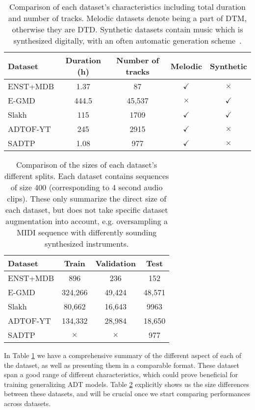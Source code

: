 \begin{table}[H]
    \centering
    \hspace*{-0.6cm}
    \begin{tabular}{l|cccc}
        Dataset & Duration (h) & Number of tracks & Melodic & Synthetic \\
        \hline
        ENST+MDB & 1.37 & 87 & $\checkmark$ & $\times$ \\
        E-GMD & 444.5 & 45,537 & $\times$ & $\checkmark$ \\
        Slakh & 115 & 1709 & $\checkmark$ & $\checkmark$ \\
        ADTOF-YT & 245 & 2915 & $\checkmark$ & $\times$ \\
        SADTP & 1.08 & 977 & $\checkmark$ & $\times$ \\
    \end{tabular}
    \caption{Comparison of each dataset's characteristics including total duration and number of tracks. Melodic datasets denote being a part of \gls{DTM}, otherwise they are \gls{DTD}. Synthetic datasets contain music which is synthesized digitally, with an often automatic generation scheme~\cite{zehren2024analyzingreducingsynthetictorealtransfer}.}
    \label{DatasetSummaryTable}
\end{table}

\begin{table}[H]
    \centering
    \hspace*{-0.6cm}
    \begin{tabular}{l|ccc}
        Dataset & Train & Validation & Test \\
        \hline
        ENST+MDB & 896 & 236 & 152 \\
        E-GMD & 324,266 & 49,424 & 48,571 \\
        Slakh & 80,662 & 16,643 & 9963 \\
        ADTOF-YT & 134,332 & 28,984 & 18,650 \\
        SADTP & $\times$ & $\times$ & 977 \\
    \end{tabular}
    \caption{Comparison of the sizes of each dataset's different splits. Each dataset contains sequences of size 400 (corresponding to 4 second audio clips). These only summarize the direct size of each dataset, but does not take specific dataset augmentation into account, e.g. oversampling a MIDI sequence with differently sounding synthesized instruments.}
    \label{DatasetSplitSummaryTable}
\end{table}

In Table \ref{DatasetSummaryTable} we have a comprehensive summary of the different aspect of each of the dataset, as well as presenting them in a comparable format. These dataset span a good range of different characteristics, which could prove beneficial for training generalizing \gls{ADT} models. Table \ref{DatasetSplitSummaryTable} explicitly shows us the size differences between these datasets, and will be crucial once we start comparing performances across datasets.